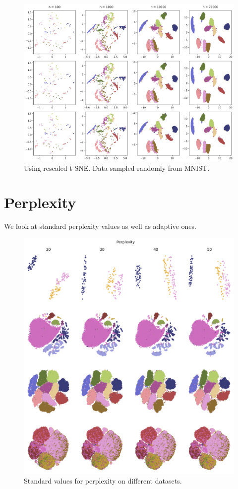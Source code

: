 \begin{figure}[h]
    \centering 
        \includegraphics[width=\linewidth]{figures/rescaled/MNIST_rescaled_embedding_grid.png}
        \caption{Using rescaled t-SNE. Data sampled randomly from MNIST.}
    \label{fig:MNIST-rescaled}
\end{figure}
\newpage 
\section{Perplexity}
We look at standard perplexity values as well as adaptive ones. 
\begin{figure}[h]
    \centering 
        \includegraphics[width=\linewidth]{../code/figures/perp_fixed_embedding_grid_tab20b.png}
        \caption{Standard values for perplexity on different datasets. }
    \label{fig:perp_fixed_grid}
\end{figure}

